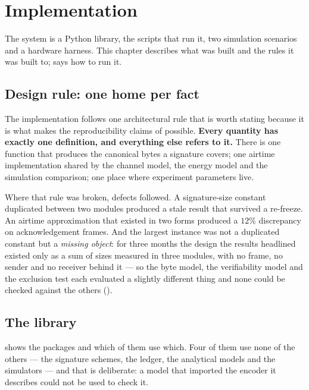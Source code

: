 \chapter{Implementation}\label{ch:implementation}

The system is a Python library, the scripts that run
it, two simulation scenarios and a hardware harness. This chapter describes what was built and
the rules it was built to;  says how to run it.

\section{Design rule: one home per fact}

The implementation follows one architectural rule that is worth stating because it is what makes
the reproducibility claims of  possible. \textbf{Every quantity has
exactly one definition, and everything else refers to it.} There is one function that produces the
canonical bytes a signature covers; one airtime implementation shared by the channel model, the
energy model and the simulation comparison; one place where experiment parameters live.

Where that rule was broken, defects followed. A signature-size constant duplicated between two
modules produced a stale result that survived a re-freeze. An airtime approximation that existed in
two forms produced a $12\%$ discrepancy on acknowledgement frames. And the largest instance was
not a duplicated constant but a \emph{missing object}: for three months the design the results
headlined existed only as a sum of sizes measured in three modules, with no frame, no sender and
no receiver behind it --- so the byte model, the verifiability model and the exclusion test each
evaluated a slightly different thing and none could be checked against the others
().

\section{The library}

 shows the packages and which of them use which. Four of them use none of the others --- the signature schemes, the ledger, the analytical models
and the simulators --- and that is deliberate: a model that imported the encoder it describes could not be used to check it.

